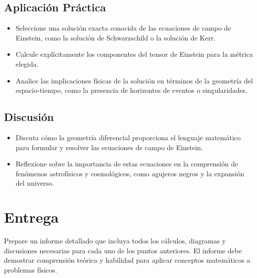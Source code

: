 \documentclass{article}
\begin{document}
	\subsection*{Aplicación Práctica}
	\begin{itemize}
		\item Seleccione una solución exacta conocida de las ecuaciones de campo de Einstein, como la solución de Schwarzschild o la solución de Kerr.
		\item Calcule explícitamente los componentes del tensor de Einstein para la métrica elegida.
		\item Analice las implicaciones físicas de la solución en términos de la geometría del espacio-tiempo, como la presencia de horizontes de eventos o singularidades.
	\end{itemize}
	
	\subsection*{Discusión}
	\begin{itemize}
		\item Discuta cómo la geometría diferencial proporciona el lenguaje matemático para formular y resolver las ecuaciones de campo de Einstein.
		\item Reflexione sobre la importancia de estas ecuaciones en la comprensión de fenómenos astrofísicos y cosmológicos, como agujeros negros y la expansión del universo.
	\end{itemize}
	
	\section*{Entrega}
	Prepare un informe detallado que incluya todos los cálculos, diagramas y discusiones necesarias para cada uno de los puntos anteriores. El informe debe demostrar comprensión teórica y habilidad para aplicar conceptos matemáticos a problemas físicos.
	
\end{document}
